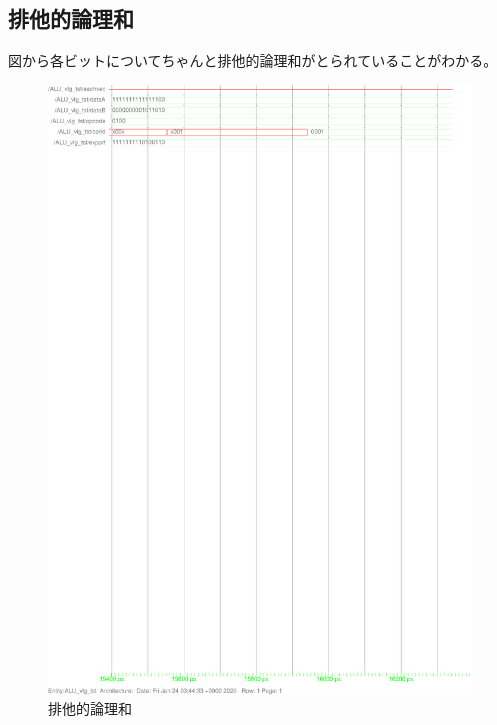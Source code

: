 \documentclass{jsarticle}
\begin{document}
\subsection{排他的論理和}
図から各ビットについてちゃんと排他的論理和がとられていることがわかる。
\begin{figure}
    \caption{排他的論理和}
  \includegraphics[scale=0.8]{ALU_xor.ps}
\end{figure}
\end{document}
